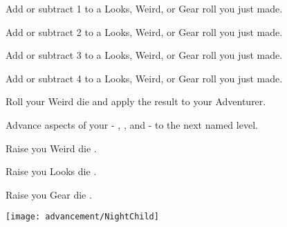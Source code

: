 \begin{multicols*}{2}


Add or subtract 1 to a Looks, Weird, or Gear roll you just made.


Add or subtract 2 to a Looks, Weird, or Gear roll you just made.


Add or subtract 3 to a Looks, Weird, or Gear roll you just made.


Add or subtract 4 to a Looks, Weird, or Gear roll you just made.



Roll your Weird die and apply the result to your Adventurer.

\cbreak


Advance  aspects of your  - \DEATH, \INJURY, and \INSANITY - to the next named level.



Raise you Weird die \DCUP.


Raise you Looks die \DCUP.


Raise you Gear die \DCUP.

\end{multicols*}
\newpage

\begin{center}
\texttt{[image: advancement/NightChild]}
\end{center}

